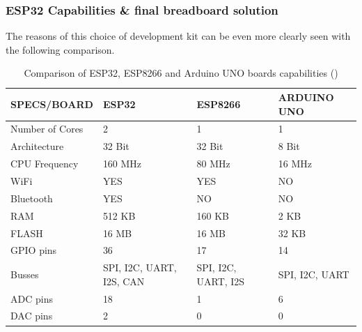 \subsubsection{ESP32 Capabilities \& final breadboard solution}
\label{subsubsec:hardware/esp32_capabilities} 

The reasons of this choice of development kit can be even more clearly seen with the following comparison.

\begin{table}[ht]
\centering
\caption{Comparison of ESP32, ESP8266 and Arduino UNO boards capabilities (\cite{esp32futureelectronics})}
\label{tab:Comparison_ESP32_ArduinoUNO}
\begin{tabular}{|p{5cm}|p{3cm}|p{3cm}|p{3.5cm}|}
\hline
\textbf{SPECS/BOARD} & \textbf{ESP32}           & \textbf{ESP8266}    & \textbf{ARDUINO UNO} \\ \hline \hline
Number of Cores      & 2                        & 1                   & 1                    \\ \hline
Architecture         & 32 Bit                   & 32 Bit              & 8 Bit                \\ \hline
CPU Frequency        & 160 MHz                  & 80 MHz              & 16 MHz               \\ \hline
WiFi                 & YES                      & YES                 & NO                   \\ \hline
Bluetooth            & YES                      & NO                  & NO                   \\ \hline
RAM                  & 512 KB                   & 160 KB              & 2 KB                 \\ \hline
FLASH                & 16 MB                    & 16 MB               & 32 KB                \\ \hline
GPIO pins            & 36                       & 17                  & 14                   \\ \hline
Busses               & SPI, I2C, UART, I2S, CAN & SPI, I2C, UART, I2S & SPI, I2C, UART       \\ \hline
ADC pins             & 18                       & 1                   & 6                    \\ \hline
DAC pins             & 2                        & 0                   & 0                    \\ \hline
\end{tabular}
\end{table}


